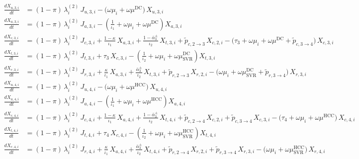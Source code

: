 \begin{align*}
\frac{dX_{u,3,i}}{dt}
  &= (1-\pi)\,\lambda_i^{(2)}\,J_{u,3,i}
     - \bigl(\omega\mu_i + \omega\mu^{\mathrm{DC}}\bigr)\,X_{u,3,i}
\\[0.8em]
\frac{dX_{a,3,i}}{dt}
  &= (1-\pi)\,\lambda_i^{(2)}\,J_{a,3,i}
     - \left(\frac{1}{\iota_1} + \omega\mu_i + \omega\mu^{\mathrm{DC}}\right)X_{a,3,i}
\\[0.8em]
\frac{dX_{c,3,i}}{dt}
  &= (1-\pi)\,\lambda_i^{(2)}\,J_{c,3,i}
     + \frac{1-\kappa}{\iota_1}\,X_{a,3,i}
     + \frac{1-\bar{\alpha}_3^{\pm}}{\iota_2}\,X_{t,3,i}
     + \tilde{p}_{c,2\to3}\,X_{c,2,i}
     - \bigl(\tau_3 + \omega\mu_i + \omega\mu^{\mathrm{DC}} + \tilde{p}_{c,3\to4}\bigr)\,X_{c,3,i}
\\[0.8em]
\frac{dX_{t,3,i}}{dt}
  &= (1-\pi)\,\lambda_i^{(2)}\,J_{t,3,i}
     + \tau_3\,X_{c,3,i}
     - \left(\frac{1}{\iota_2} + \omega\mu_i + \omega\mu^{\mathrm{DC}}_{\mathrm{SVR}}\right)X_{t,3,i}
\\[0.8em]
\frac{dX_{r,3,i}}{dt}
  &= (1-\pi)\,\lambda_i^{(2)}\,J_{r,3,i}
     + \frac{\kappa}{\iota_1}\,X_{a,3,i}
     + \frac{\bar{\alpha}_3^{\pm}}{\iota_2}\,X_{t,3,i}
     + \tilde{p}_{r,2\to3}\,X_{r,2,i}
     - \bigl(\omega\mu_i + \omega\mu^{\mathrm{DC}}_{\mathrm{SVR}}
             + \tilde{p}_{r,3\to4}\bigr)\,X_{r,3,i}
\\[1.2em]
\frac{dX_{u,4,i}}{dt}
  &= (1-\pi)\,\lambda_i^{(2)}\,J_{u,4,i}
     - \bigl(\omega\mu_i + \omega\mu^{\mathrm{HCC}}\bigr)\,X_{u,4,i}
\\[0.8em]
\frac{dX_{a,4,i}}{dt}
  &= (1-\pi)\,\lambda_i^{(2)}\,J_{a,4,i}
     - \left(\frac{1}{\iota_1} + \omega\mu_i + \omega\mu^{\mathrm{HCC}}\right)X_{a,4,i}
\\[0.8em]
\frac{dX_{c,4,i}}{dt}
  &= (1-\pi)\,\lambda_i^{(2)}\,J_{c,4,i}
     + \frac{1-\kappa}{\iota_1}\,X_{a,4,i}
     + \frac{1-\bar{\alpha}_3^{\pm}}{\iota_2}\,X_{t,4,i}
     + \tilde{p}_{c,2\to4}\,X_{c,2,i}
     + \tilde{p}_{c,3\to4}\,X_{c,3,i}
     - \bigl(\tau_4 + \omega\mu_i + \omega\mu^{\mathrm{HCC}}\bigr)\,X_{c,4,i}
\\[0.8em]
\frac{dX_{t,4,i}}{dt}
  &= (1-\pi)\,\lambda_i^{(2)}\,J_{t,4,i}
     + \tau_4\,X_{c,4,i}
     - \left(\frac{1}{\iota_2} + \omega\mu_i + \omega\mu^{\mathrm{HCC}}_{\mathrm{SVR}}\right)X_{t,4,i}
\\[0.8em]
\frac{dX_{r,4,i}}{dt}
  &= (1-\pi)\,\lambda_i^{(2)}\,J_{r,4,i}
     + \frac{\kappa}{\iota_1}\,X_{a,4,i}
     + \frac{\bar{\alpha}_3^{\pm}}{\iota_2}\,X_{t,4,i}
     + \tilde{p}_{r,2\to4}\,X_{r,2,i}
     + \tilde{p}_{r,3\to4}\,X_{r,3,i}
     - \bigl(\omega\mu_i + \omega\mu^{\mathrm{HCC}}_{\mathrm{SVR}}\bigr)\,X_{r,4,i}
\end{align*}
